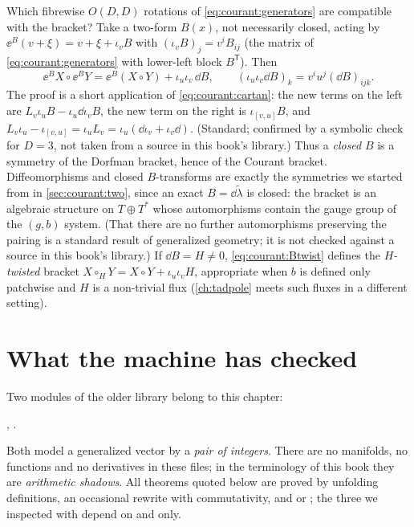 Which fibrewise $O(D,D)$ rotations of \eqref{eq:courant:generators} are compatible with the
bracket? Take a two-form $B(x)$, not necessarily closed, acting by
$\ee^B(v+\xi)=v+\xi+\iota_vB$ with $(\iota_vB)_j=v^iB_{ij}$ (the matrix of
\eqref{eq:courant:generators} with lower-left block $B^{\mathsf T}$). Then
\begin{equation}\label{eq:courant:Btwist}
\ee^BX\circ\ee^BY=\ee^B(X\circ Y)+\iota_u\iota_v\,\dd B,\qquad
(\iota_u\iota_v\dd B)_k=v^iu^j(\dd B)_{ijk} .
\end{equation}
The proof is a short application of \eqref{eq:courant:cartan}: the new terms on the left are
$L_v\iota_uB-\iota_u\dd\iota_vB$, the new term on the right is $\iota_{[v,u]}B$, and
$L_v\iota_u-\iota_{[v,u]}=\iota_uL_v=\iota_u(\dd\iota_v+\iota_v\dd)$. (Standard; confirmed by a
symbolic check for $D=3$, not taken from a source in this book's library.) Thus a \emph{closed}
$B$ is a symmetry of the Dorfman bracket, hence of the Courant bracket. Diffeomorphisms and closed $B$-transforms are exactly the symmetries we started from in
\cref{sec:courant:two}, since an exact $B=\dd\tilde\lambda$ is closed: the bracket is an algebraic
structure on $T\oplus T^*$ whose automorphisms contain the gauge group of the $(g,b)$ system.
(That there are no further automorphisms preserving the pairing is a standard result of
generalized geometry; it is not checked against a source in this book's library.) If $\dd B=H\neq0$, \eqref{eq:courant:Btwist} defines the \emph{$H$-twisted} bracket
$X\circ_HY=X\circ Y+\iota_u\iota_vH$, appropriate when $b$ is defined only patchwise and $H$ is a
non-trivial flux (\cref{ch:tadpole} meets such fluxes in a different setting).

\section{What the machine has checked}\label{sec:courant:lean}

Two modules of the older  library belong to this chapter:
\begin{center}
,\qquad
{}.
\end{center}
Both model a generalized vector by a \emph{pair of integers}. There are no manifolds, no
functions and no derivatives in these files; in the terminology of this book they are
\emph{arithmetic shadows}. All theorems quoted below are proved by unfolding definitions, an occasional
rewrite with commutativity, and  or ; the three we inspected with  depend on  and
 only.

